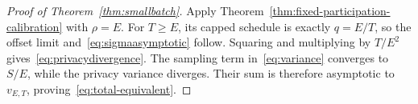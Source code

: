 \begin{proof}[Proof of Theorem~\ref{thm:smallbatch}]
Apply Theorem~\ref{thm:fixed-participation-calibration} with $\rho=E$.
For $T\geq E$, its capped schedule is exactly $q=E/T$, so the offset limit
and~\eqref{eq:sigmaasymptotic} follow. Squaring and multiplying by $T/E^2$
gives~\eqref{eq:privacydivergence}. The sampling term in~\eqref{eq:variance}
converges to $S/E$, while the privacy variance diverges. Their sum is
therefore asymptotic to $v_{E,T}$, proving~\eqref{eq:total-equivalent}.
\end{proof}
